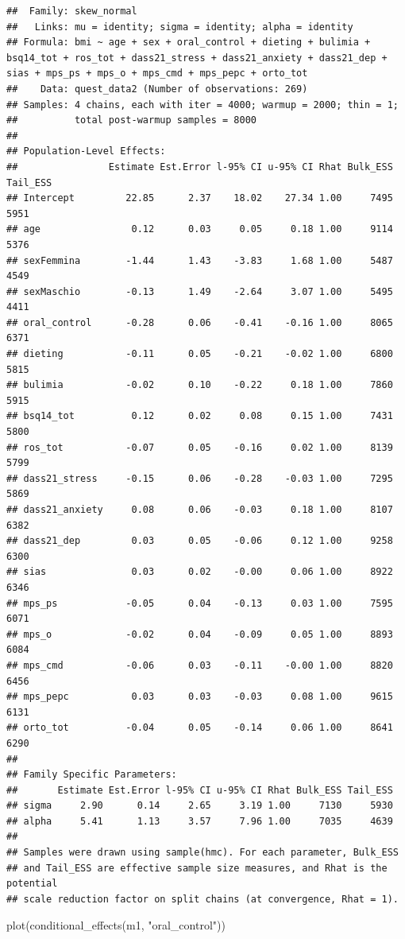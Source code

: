 \documentclass[
]{article}
\newenvironment{Shaded}{\begin{snugshade}}{\end{snugshade}}
\newcommand{\FunctionTok}[1]{\textcolor[rgb]{0.00,0.00,0.00}{#1}}
\newcommand{\NormalTok}[1]{#1}
\newcommand{\StringTok}[1]{\textcolor[rgb]{0.31,0.60,0.02}{#1}}
\begin{document}
\begin{verbatim}
##  Family: skew_normal 
##   Links: mu = identity; sigma = identity; alpha = identity 
## Formula: bmi ~ age + sex + oral_control + dieting + bulimia + bsq14_tot + ros_tot + dass21_stress + dass21_anxiety + dass21_dep + sias + mps_ps + mps_o + mps_cmd + mps_pepc + orto_tot 
##    Data: quest_data2 (Number of observations: 269) 
## Samples: 4 chains, each with iter = 4000; warmup = 2000; thin = 1;
##          total post-warmup samples = 8000
## 
## Population-Level Effects: 
##                Estimate Est.Error l-95% CI u-95% CI Rhat Bulk_ESS Tail_ESS
## Intercept         22.85      2.37    18.02    27.34 1.00     7495     5951
## age                0.12      0.03     0.05     0.18 1.00     9114     5376
## sexFemmina        -1.44      1.43    -3.83     1.68 1.00     5487     4549
## sexMaschio        -0.13      1.49    -2.64     3.07 1.00     5495     4411
## oral_control      -0.28      0.06    -0.41    -0.16 1.00     8065     6371
## dieting           -0.11      0.05    -0.21    -0.02 1.00     6800     5815
## bulimia           -0.02      0.10    -0.22     0.18 1.00     7860     5915
## bsq14_tot          0.12      0.02     0.08     0.15 1.00     7431     5800
## ros_tot           -0.07      0.05    -0.16     0.02 1.00     8139     5799
## dass21_stress     -0.15      0.06    -0.28    -0.03 1.00     7295     5869
## dass21_anxiety     0.08      0.06    -0.03     0.18 1.00     8107     6382
## dass21_dep         0.03      0.05    -0.06     0.12 1.00     9258     6300
## sias               0.03      0.02    -0.00     0.06 1.00     8922     6346
## mps_ps            -0.05      0.04    -0.13     0.03 1.00     7595     6071
## mps_o             -0.02      0.04    -0.09     0.05 1.00     8893     6084
## mps_cmd           -0.06      0.03    -0.11    -0.00 1.00     8820     6456
## mps_pepc           0.03      0.03    -0.03     0.08 1.00     9615     6131
## orto_tot          -0.04      0.05    -0.14     0.06 1.00     8641     6290
## 
## Family Specific Parameters: 
##       Estimate Est.Error l-95% CI u-95% CI Rhat Bulk_ESS Tail_ESS
## sigma     2.90      0.14     2.65     3.19 1.00     7130     5930
## alpha     5.41      1.13     3.57     7.96 1.00     7035     4639
## 
## Samples were drawn using sample(hmc). For each parameter, Bulk_ESS
## and Tail_ESS are effective sample size measures, and Rhat is the potential
## scale reduction factor on split chains (at convergence, Rhat = 1).
\end{verbatim}

\begin{Shaded}
\begin{Highlighting}[]
\FunctionTok{plot}\NormalTok{(}\FunctionTok{conditional\_effects}\NormalTok{(m1, }\StringTok{"oral\_control"}\NormalTok{))}
\end{Highlighting}
\end{Shaded}
\end{document}
